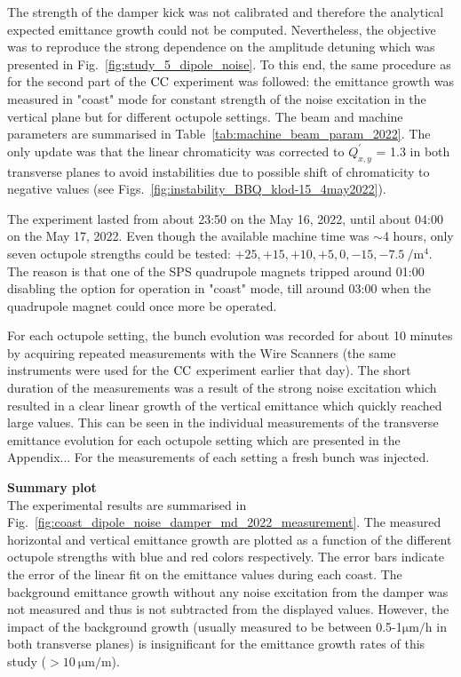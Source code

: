 The strength of the damper kick was not calibrated and therefore the analytical expected emittance growth could not be computed. Nevertheless, the objective was to reproduce the strong dependence on the amplitude detuning which was presented in Fig.~\ref{fig:study_5_dipole_noise}. To this end, the same procedure as for the second part of the ${\mathrm{CC}}$ experiment was followed: the emittance growth was measured in "coast" mode for constant strength of the noise excitation in the vertical plane but for different octupole settings. The beam and machine parameters are summarised in Table~\ref{tab:machine_beam_param_2022}. The only update was that the linear chromaticity was corrected to $Q^\prime_{x,y}$ = 1.3 in both transverse planes to avoid instabilities due to possible shift of chromaticity to negative values (see Figs.~\ref{fig:instability_BBQ_klod-15_4may2022}).%

The experiment lasted from about 23:50 on the May 16, 2022, until about 04:00 on the May 17, 2022. Even though the available machine time was $\sim$4 hours, only seven octupole strengths could be tested: $+25, +15, +10, +5, 0, -15, -7.5 \ \mathrm{/m^4}$. The reason is that one of the SPS quadrupole magnets tripped around 01:00 disabling the option for operation in "coast" mode, till around 03:00 when the quadrupole magnet could once more be operated.

For each octupole setting, the bunch evolution was recorded for about 10 minutes by acquiring repeated measurements with the Wire Scanners (the same instruments were used for the ${\mathrm{CC}}$ experiment earlier that day). The short duration of the measurements was a result of the strong noise excitation which resulted in a clear linear growth of the vertical emittance which quickly reached large values. This can be seen in the individual measurements of the transverse emittance evolution for each octupole setting which are presented in the Appendix... For the measurements of each setting a fresh bunch was injected. 


\textbf{Summary plot}\\
The experimental results are summarised in Fig.~\ref{fig:coast_dipole_noise_damper_md_2022_measurement}. The measured horizontal and vertical emittance growth are plotted as a function of the different octupole strengths with blue and red colors respectively. The error bars indicate the error of the linear fit on the emittance values during each coast. The background emittance growth without any noise excitation from the damper was not measured and thus is not subtracted from the displayed values. However, the impact of the background growth (usually measured to be between 0.5-1$\mathrm{\mu m/h}$ in both transverse planes) is insignificant for the emittance growth rates of this study ($ > 10 \ \mathrm{\mu m/m}$).
 

